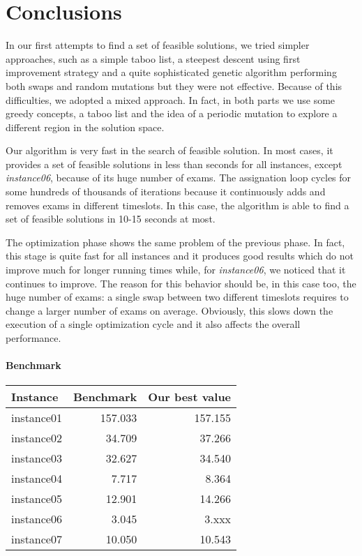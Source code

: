 \section*{Conclusions}
In our first attempts to find a set of feasible solutions, we tried simpler approaches, such as a simple taboo list, a steepest descent using first improvement strategy and a quite sophisticated genetic algorithm performing both swaps and random mutations but they were not effective. Because of this difficulties, we adopted a mixed approach. In fact, in both parts we use some greedy concepts, a taboo list and the idea of a periodic mutation to explore a different region in the solution space.

Our algorithm is very fast in the search of feasible solution. In most cases, it provides a set of feasible solutions in less than seconds for all instances, except \emph{instance06}, because of its huge number of exams. The assignation loop cycles for some hundreds of thousands of iterations because it continuously adds and removes exams in different timeslots. In this case, the algorithm is able to find a set of feasible solutions in 10-15 seconds at most.

The optimization phase shows the same problem of the previous phase. In fact, this stage is quite fast for all instances and it produces good results which do not improve much for longer running times while, for \emph{instance06}, we noticed that it continues to improve. The reason for this behavior should be, in this case too, the huge number of exams: a single swap between two different timeslots requires to change a larger number of exams on average. Obviously, this slows down the execution of a single optimization cycle and it also affects the overall performance.

\paragraph*{Benchmark}
\begin{center}
\begin{tabular}{lrr}
\toprule
Instance	&	Benchmark	&	Our best value\\
\midrule
instance01	&	157.033	&	157.155	\\
instance02	&	34.709	&	37.266	\\
instance03	&	32.627	&	34.540	\\
instance04	&	7.717	&	8.364	\\
instance05	&	12.901	&	14.266	\\
instance06	&	3.045	&	3.xxx	\\
instance07	&	10.050	&	10.543	\\
\bottomrule
\end{tabular}
\end{center}